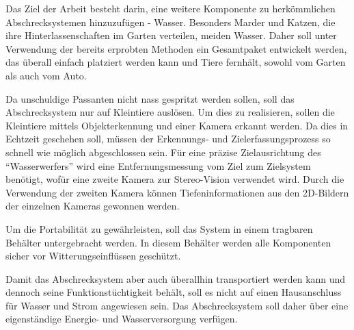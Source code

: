 

Das Ziel der Arbeit besteht darin, eine weitere Komponente zu herkömmlichen Abschrecksystemen hinzuzufügen - Wasser. Besonders Marder und Katzen, die ihre Hinterlassenschaften im Garten verteilen, meiden Wasser. Daher soll unter Verwendung der bereits erprobten Methoden ein Gesamtpaket entwickelt werden, das überall einfach platziert werden kann und Tiere fernhält, sowohl vom Garten als auch vom Auto.

Da unschuldige Passanten nicht nass gespritzt werden sollen, soll das Abschrecksystem nur auf Kleintiere auslösen. Um dies zu realisieren, sollen die Kleintiere mittels Objekterkennung und einer Kamera erkannt werden. Da dies in Echtzeit geschehen soll, müssen der Erkennungs- und Zielerfassungsprozess so schnell wie möglich abgeschlossen sein. Für eine präzise Zielausrichtung des \enquote{Wasserwerfers} wird eine Entfernungsmessung vom Ziel zum Zielsystem benötigt, wofür eine zweite Kamera zur Stereo-Vision verwendet wird. Durch die Verwendung der zweiten Kamera können Tiefeninformationen aus den 2D-Bildern der einzelnen Kameras gewonnen werden.

Um die Portabilität zu gewährleisten, soll das System in einem tragbaren Behälter untergebracht werden. In diesem Behälter werden alle Komponenten sicher vor Witterungseinflüssen geschützt.

Damit das Abschrecksystem aber auch überallhin transportiert werden kann und dennoch seine Funktionstüchtigkeit behält, soll es nicht auf einen Hausanschluss für Wasser und Strom angewiesen sein. Das Abschrecksystem soll daher über eine eigenständige Energie- und Wasserversorgung verfügen.


